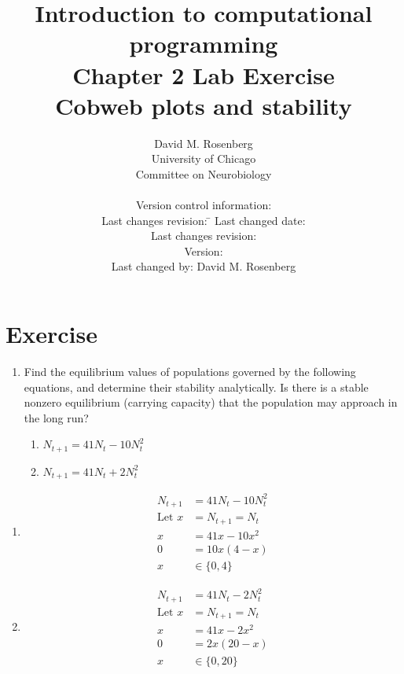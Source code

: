 \documentclass[10pt,letterpaper]{article}
\title{Introduction to computational programming\\\smaller Chapter 2 Lab Exercise \\\smaller Cobweb plots and stability}
\author{David M. Rosenberg\\\small University of Chicago\\\small Committee on Neurobiology\medskip\\
{\footnotesize \parbox[t]{10cm} {
Version control information:
\begin{tabbing}
\footnotesize\sffamily
 Last changes revision: \= \kill
 Last changed date: \> \svndate\\
 Last changes revision: \> \svnrev\\
 Version: \> \svnFullRevision*{\svnrev}\\
 Last changed by: \> David M. Rosenberg\\
\end{tabbing}
}
}}
\begin{document}


\maketitle

\part{Exercise} %
\label{prt:exercise}

\begin{enumerate}
  \item Find the equilibrium values of populations governed by the following equations, and determine their stability analytically. Is there is a stable nonzero equilibrium  (carrying capacity) that the population may approach in the long run?
  \begin{enumerate}
    \item $N_{t+1} = 41N_t -10N_t^2$
    \item $N_{t+1} = 41N_t +2N_t^2$
  \end{enumerate}
\end{enumerate}


\begin{Solution}
  \begin{enumerate}
    \begin{enumerate}
\item
    \begin{align*}
        N_{t+1} &= 41 N_t - 10 N_t^2 \\
        \text{Let } x &= N_{t+1} = N_t \\
        x &= 41 x - 10 x^2 \\
        0 &= 10 x (4 - x) \\
        x &\in \{ 0, 4 \} 
      \end{align*}
\item
    \begin{align*}
        N_{t+1} &= 41 N_t - 2 N_t^2\\
        \text{Let } x &= N_{t+1} = N_t \\
        x &= 41 x - 2 x^2 \\
        0 &= 2 x (20 - x) \\
        x  &\in \{ 0, 20 \}
    \end{align*}
\end{enumerate}
\end{enumerate}
\end{Solution}
\end{document}
